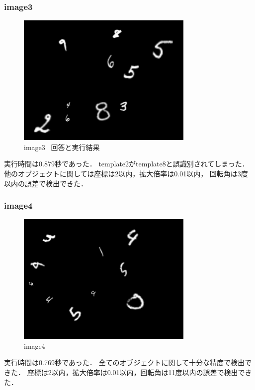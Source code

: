 \documentclass[platex,dvipdfmx]{jsarticle}
\begin{document}
\subsubsection{image3}
\begin{figure}[h]
\centering
\includegraphics[clip,width = 8.5cm]{images/image3.png}
\caption{image3~ 回答と実行結果}
\label{graph3}
\end{figure}


\newpage
実行時間は0.879秒であった．
template2がtemplate8と誤識別されてしまった．
他のオブジェクトに関しては座標は2以内，拡大倍率は0.01以内，
回転角は3度以内の誤差で検出できた．
\newpage


\subsubsection{image4}

\begin{figure}[h]
\centering
\includegraphics[clip,width = 8.5cm]{images/image4.png}
\caption{image4}
\label{graph4}
\end{figure}


\newpage
実行時間は0.769秒であった．
全てのオブジェクトに関して十分な精度で検出できた．
座標は2以内，拡大倍率は0.01以内，回転角は11度以内の誤差で検出できた．
\end{document}
